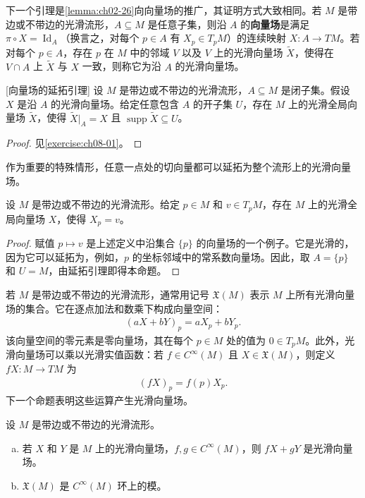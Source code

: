 \documentclass[../../main.tex]{subfiles}
\begin{document}
下一个引理是\cref{lemma:ch02-26}向向量场的推广，其证明方式大致相同。若 $M$ 是带边或不带边的光滑流形，$A\subseteq M$ 是任意子集，则沿 $A$ 的\textbf{向量场}是满足 $\pi\circ X=\operatorname{Id}_A$（换言之，对每个 $p\in A$ 有 $X_p\in T_pM$）的连续映射 $X\colon A\to TM$。若对每个 $p\in A$，存在 $p$ 在 $M$ 中的邻域 $V$ 以及 $V$ 上的光滑向量场 $\widetilde{X}$，使得在 $V\cap A$ 上 $\widetilde{X}$ 与 $X$ 一致，则称它为沿 $A$ 的光滑向量场。

\begin{lemma}\label{lemma:ch08-06}[向量场的延拓引理]
设 $M$ 是带边或不带边的光滑流形，$A\subseteq M$ 是闭子集。假设 $X$ 是沿 $A$ 的光滑向量场。给定任意包含 $A$ 的开子集 $U$，存在 $M$ 上的光滑全局向量场 $\widetilde{X}$，使得 $\widetilde{X}|_A=X$ 且 $\operatorname{supp}\widetilde{X}\subseteq U$。
\end{lemma}

\begin{proof}
见\cref{exercise:ch08-01}。
\end{proof}

作为重要的特殊情形，任意一点处的切向量都可以延拓为整个流形上的光滑向量场。

\begin{proposition}\label{proposition:ch08-07}
设 $M$ 是带边或不带边的光滑流形。给定 $p\in M$ 和 $v\in T_pM$，存在 $M$ 上的光滑全局向量场 $X$，使得 $X_p=v$。
\end{proposition}

\begin{proof}
赋值 $p\mapsto v$ 是上述定义中沿集合 $\{p\}$ 的向量场的一个例子。它是光滑的，因为它可以延拓为，例如，$p$ 的坐标邻域中的常系数向量场。因此，取 $A=\{p\}$ 和 $U=M$，由延拓引理即得本命题。
\end{proof}

若 $M$ 是带边或不带边的光滑流形，通常用记号 $\mathfrak{X}(M)$ 表示 $M$ 上所有光滑向量场的集合。它在逐点加法和数乘下构成向量空间：
\begin{align*}
(aX+bY)_p=aX_p+bY_p.
\end{align*}
该向量空间的零元素是零向量场，其在每个 $p\in M$ 处的值为 $0\in T_pM$。此外，光滑向量场可以乘以光滑实值函数：若 $f\in C^\infty(M)$ 且 $X\in\mathfrak{X}(M)$，则定义 $fX\colon M\to TM$ 为
\begin{align*}
(fX)_p=f(p)X_p.
\end{align*}
下一个命题表明这些运算产生光滑向量场。

\begin{proposition}\label{proposition:ch08-08}
设 $M$ 是带边或不带边的光滑流形。
\begin{enumerate}[(a)]
\item 若 $X$ 和 $Y$ 是 $M$ 上的光滑向量场，$f,g\in C^\infty(M)$，则 $fX+gY$ 是光滑向量场。
\item $\mathfrak{X}(M)$ 是 $C^\infty(M)$ 环上的模。
\end{enumerate}
\end{proposition}
\end{document}

